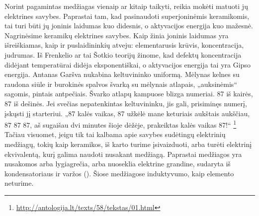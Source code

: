 Norint pagamintas medžiagas vienaip ar kitaip taikyti, reikia mokėti
matuoti jų elektrines savybes. Paprastai tam, kad pasinaudoti
superjoninėmis keramikomis, tai turi būti jų joninis laidumas
kuo didesnis, o aktyvacijos energija kuo mažesnė. Nagrinėsime keramikų
elektrines savybes. Kaip žinia joninis laidumas yra išreiškiamas,
kaip ir puslaidininkių atveju: elementarusis krūvis, koncentracija,
judrumas. Iš Frenkelio ar tai Šotkio teorijų žinome, kad defektų
koncentracija didėjant temperatūrai didėja eksponentiškai, o aktyvacijos
energija tai yra Gipso energija.
  {Antanas Garšva nukabina keltuvininko uniformą. Mėlynas kelnes su
  raudona siūle ir burokinės spalvos švarką su mėlynais atlapais,
  „auksinėmis“ sagomis, pintais antpečiais. Švarko atlapų kampuose
  blizga numeriai. 87 iš kairės, 87 iš dešinės. Jei svečias
  nepatenkintas keltuvininku, jis gali, prisiminęs numerį, įskųsti jį
  starteriui. „87 kalės vaikas, 87 užkėlė mane keturiais aukštais
  aukščiau, 87 87 87, aš sugaišau dvi minutes šioje dėžėje,
  prakeiktas kalės vaikas 87!“}%
\footnote{\url{http://antologija.lt/texts/58/tekstas/01.html}}
Tačiau visuomet, jeigu tik tai kalbama apie savybes sudėtingų
elektrinių medžiagų, tokių kaip keramikos, iš karto turime
įsivaizduoti, arba turėti elektrinį ekvivalentą, kurį galima
naudoti nusakant medžiagą. Paprastai medžiagos yra nusakomos arba
lygiagrečia, arba nuoseklia elektrine grandine, sudaryta iš
kondensatoriaus ir varžos (). Šiose medžiagose induktyvumo,
kaip elemento neturime.

